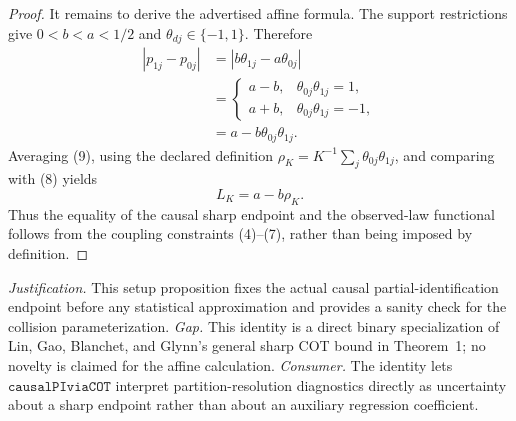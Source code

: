 \documentclass{article}
\begin{document}
\begin{proof}
It remains to derive the advertised affine formula.  The support restrictions give \(0<b<a<1/2\) and \(\theta_{dj}\in\{-1,1\}\).  Therefore
\[
 \begin{aligned}
 |p_{1j}-p_{0j}|
 &=|b\theta_{1j}-a\theta_{0j}|\\
 &=\begin{cases}
    a-b,&\theta_{0j}\theta_{1j}=1,\\
    a+b,&\theta_{0j}\theta_{1j}=-1,
   \end{cases}\\
 &=a-b\theta_{0j}\theta_{1j}.                    \tag{9}
 \end{aligned}
\]
Averaging (9), using the declared definition
\(\rho_K=K^{-1}\sum_j\theta_{0j}\theta_{1j}\), and comparing with (8) yields
\[
 L_K=a-b\rho_K.                                   \tag{10}
\]
Thus the equality of the causal sharp endpoint and the observed-law functional follows from the coupling constraints (4)--(7), rather than being imposed by definition.
\end{proof}
\par\smallskip\noindent \textit{Justification.} This setup proposition fixes the actual causal partial-identification endpoint before any statistical approximation and provides a sanity check for the collision parameterization. \textit{Gap.} This identity is a direct binary specialization of Lin, Gao, Blanchet, and Glynn's general sharp COT bound in Theorem~1; no novelty is claimed for the affine calculation. \textit{Consumer.} The identity lets \(\texttt{causalPIviaCOT}\) interpret partition-resolution diagnostics directly as uncertainty about a sharp endpoint rather than about an auxiliary regression coefficient.
\end{document}
